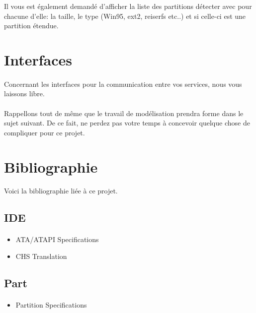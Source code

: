 \documentclass[10pt,a4wide]{article}
\begin{document}
Il vous est \'egalement demand\'e d'afficher la liste des partitions
d\'etecter avec pour chacune d'elle: la taille, le type (Win95, ext2,
reiserfs etc..) et si celle-ci est une partition \'etendue.

\section{Interfaces}

\paragraph{}

Concernant les interfaces pour la communication entre vos services, nous
vous laissons libre.

\paragraph{}

Rappellons tout de m\^eme que le travail de mod\'elisation prendra forme
dans le sujet suivant. De ce fait, ne perdez pas votre temps \`a concevoir
quelque chose de compliquer pour ce projet.

\section{Bibliographie}

\paragraph{}

Voici la bibliographie li\'ee \`a ce projet.

\subsection{IDE}

\paragraph{}

\begin{itemize}
\item ATA/ATAPI Specifications
\item CHS Translation
\end{itemize}

\subsection{Part}

\paragraph{}

\begin{itemize}
\item Partition Specifications
\end{itemize}
\end{document}
